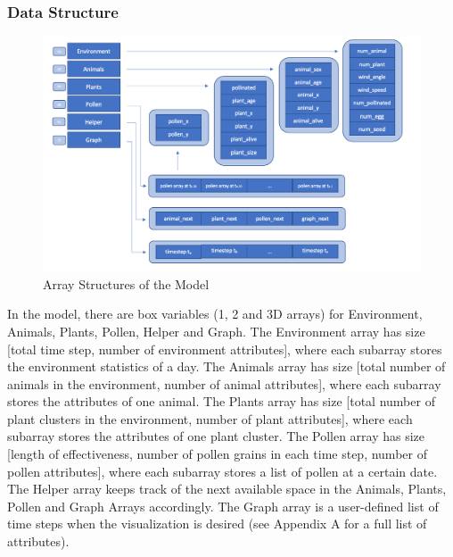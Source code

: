 \documentclass[3p,,preprint,12pt]{elsarticle}
\begin{document}
\subsubsection{Data Structure}
    
    \begin{figure}[!htb]
    \begin{center}
    \includegraphics[width=150mm]{figures/array_structure_2.png} 
    \caption{Array Structures of the Model}
    \end{center}
    \end{figure}

In the model, there are box variables (1, 2 and 3D arrays) for Environment, Animals, Plants, Pollen, Helper and Graph. The Environment array has size [total time step, number of environment attributes], where each subarray stores the environment statistics of a day. The Animals array has size [total number of animals in the environment, number of animal attributes], where each subarray stores the attributes of one animal. The Plants array has size [total number of plant clusters in the environment, number of plant attributes], where each subarray stores the attributes of one plant cluster. The Pollen array has size [length of effectiveness, number of pollen grains in each time step, number of pollen attributes], where each subarray stores a list of pollen at a certain date. The Helper array keeps track of the next available space in the Animals, Plants, Pollen and Graph Arrays accordingly. The Graph array is a user-defined list of time steps when the visualization is desired (see Appendix A for a full list of attributes). 
\end{document}
